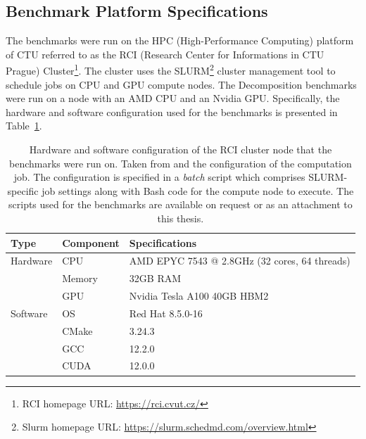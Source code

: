 \subsection{Benchmark Platform Specifications}\label{Subsection:comparing-decomposers-and-solvers->decomposition-project-benchmarks->benchmark-platform-specifications}
The benchmarks were run on the HPC (High-Performance Computing) platform of CTU referred to as the RCI (Research Center for Informations in CTU Prague) Cluster\footnote{RCI homepage URL: \url{https://rci.cvut.cz/}}. The cluster uses the SLURM\footnote{Slurm homepage URL: \url{https://slurm.schedmd.com/overview.html}} cluster management tool to schedule jobs on CPU and GPU compute nodes. The Decomposition benchmarks were run on a node with an AMD CPU and an Nvidia GPU. Specifically, the hardware and software configuration used for the benchmarks is presented in Table~\ref{Table:comparing-decomposers-and-solvers->decomposition-project-benchmarks->benchmark-platform-specifications->RCI-node-hardware-software-specifications}.

\begin{table}[ht!]
	\centering
	\begin{tabular}{|l|l|l|}
		\hline
		\rowcolor[HTML]{C0C0C0} \textbf{Type} & \textbf{Component} & \textbf{Specifications}      \\ \hline
		Hardware                         & CPU    & AMD EPYC 7543 @ 2.8GHz (32 cores, 64 threads) \\
		                                 & Memory & 32GB RAM                                      \\
		                                 & GPU    & Nvidia Tesla A100 40GB HBM2                   \\ \hline
		\rowcolor[HTML]{EFEFEF} Software & OS     & Red Hat 8.5.0-16                              \\
		\rowcolor[HTML]{EFEFEF}          & CMake  & 3.24.3                                        \\
		\rowcolor[HTML]{EFEFEF}          & GCC    & 12.2.0                                        \\
		\rowcolor[HTML]{EFEFEF}          & CUDA   & 12.0.0                                        \\ \hline
	\end{tabular}
	\caption{Hardware and software configuration of the RCI cluster node that the benchmarks were run on. Taken from  \cite{9V4RBlLGVAweD9V9} and the configuration of the computation job. The configuration is specified in a \textit{batch} script which comprises SLURM-specific job settings along with Bash code for the compute node to execute. The scripts used for the benchmarks are available on request or as an attachment to this thesis.}
	\label{Table:comparing-decomposers-and-solvers->decomposition-project-benchmarks->benchmark-platform-specifications->RCI-node-hardware-software-specifications}
\end{table}



